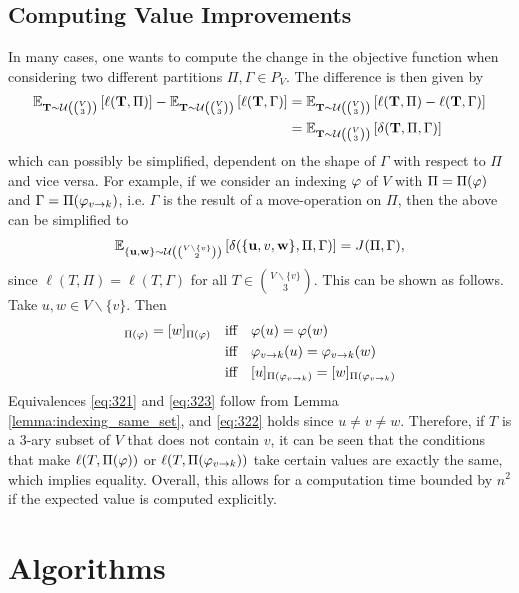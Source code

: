 \subsection{Computing Value Improvements}
In many cases, one wants to compute the change in the objective function when considering two different partitions $\Pi,\Gamma \in P_V$. The difference is then given by
\begin{align*}
    \mathbb{E}_{{\bf T} \sim \mathcal{U}\left(\binom{V}{3}\right)} \left[\ell({\bf T}, \Pi)\right] - \mathbb{E}_{{\bf T} \sim \mathcal{U}\left(\binom{V}{3}\right)} \left[\ell({\bf T}, \Gamma)\right] &= \mathbb{E}_{{\bf T} \sim \mathcal{U}\left(\binom{V}{3}\right)} \left[\ell({\bf T}, \Pi) - \ell({\bf T}, \Gamma)\right] \\
    &= \mathbb{E}_{{\bf T} \sim \mathcal{U}\left(\binom{V}{3}\right)} \left[\delta({\bf T}, \Pi, \Gamma)\right]
\end{align*}
which can possibly be simplified, dependent on the shape of $\Gamma$ with respect to $\Pi$ and vice versa. For example, if we consider an indexing $\varphi$ of $V$ with $\Pi = \Pi(\varphi)$ and $\Gamma = \Pi(\varphi_{v\rightarrow k})$, i.e. $\Gamma$ is the result of a move-operation on $\Pi$, then the above can be simplified to
\begin{align*}
    \mathbb{E}_{{\bf \{u,w\}} \sim \mathcal{U}\left(\binom{V\backslash\{v\}}{2}\right)} \left[\delta(\{{\bf u},v,{\bf w} \}, \Pi, \Gamma)\right] = J(\Pi, \Gamma),
\end{align*}
since $\ell(T,\Pi) = \ell(T,\Gamma)$ for all $T \in \binom{V \backslash \{ v\} }{3}$. This can be shown as follows. Take $u,w \in V\backslash\{v\}$. Then 
\begin{align}
    [u]_{\Pi(\idx)} = [w]_{\Pi(\idx)} &\iff \idx(u) = \idx(w)  \label{eq:321} \\
    &\iff \move{\idx}{v}{k}(u) = \move{\idx}{v}{k}(w)  \label{eq:322} \\
    &\iff [u]_{\Pi(\move{\idx}{v}{k})} = [w]_{\Pi(\move{\idx}{v}{k})}  \label{eq:323}
\end{align}
Equivalences \eqref{eq:321} and \eqref{eq:323} follow from Lemma \ref{lemma:indexing_same_set}, and \eqref{eq:322} holds since $u \neq v \neq w$. Therefore, if $T$ is a 3-ary subset of $V$ that does not contain $v$, it can be seen that the conditions that make $\ell(T,\Pi(\varphi))$ or $\ell(T,\Pi(\varphi_{v\rightarrow k}))$ take certain values are exactly the same, which implies equality. Overall, this allows for a computation time bounded by $n^2$ if the expected value is computed explicitly. 


\section{Algorithms}

